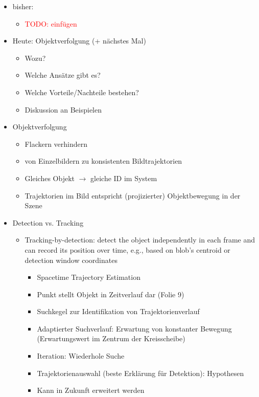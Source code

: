 \documentclass{report}
\newcommand{\todo}[2][red]{\textcolor{#1}{TODO: #2}}
\begin{document}
	\begin{itemize}
		\item bisher:
		\begin{itemize}
			\item \todo{einfügen}
		\end{itemize}
		
		\item Heute: Objektverfolgung (+ nächstes Mal)
		\begin{itemize}
			\item Wozu?
			\item Welche Ansätze gibt es?
			\item Welche Vorteile/Nachteile bestehen?
			\item Diskussion an Beispielen
		\end{itemize}
		
		\item Objektverfolgung
		\begin{itemize}
			\item Flackern verhindern
			\item von Einzelbildern zu konsistenten Bildtrajektorien
			\item Gleiches Objekt $\rightarrow$ gleiche ID im System
			\item Trajektorien im Bild entspricht (projizierter) Objektbewegung in der Szene
		\end{itemize}
		
		\item Detection vs. Tracking
		\begin{itemize}
			\item Tracking-by-detection: detect the object independently in each frame and can record its position over time, e.g., based on blob’s centroid or detection window coordinates
			\begin{itemize}
				\item Spacetime Trajectory Estimation
				\item Punkt stellt Objekt in Zeitverlauf dar (Folie 9)
				\item Suchkegel zur Identifikation von Trajektorienverlauf
				\item Adaptierter Suchverlauf: Erwartung von konstanter Bewegung (Erwartungswert im Zentrum der Kreisscheibe)
				\item Iteration: Wiederhole Suche
				\item Trajektorienauswahl (beste Erklärung für Detektion): Hypothesen
				\item Kann in Zukunft erweitert werden
			\end{itemize}
			

\end{itemize}
\end{itemize}
\end{document}
